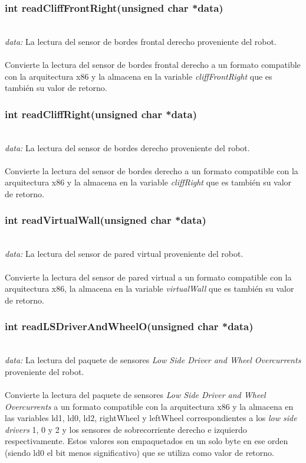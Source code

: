 \documentclass[letterpaper]{book}
\begin{document}
\subsubsection{int readCliffFrontRight(unsigned char *data)}\mbox{}\\
\emph{data: }La lectura del sensor de bordes frontal derecho proveniente del robot.\\\\
Convierte la lectura del sensor de bordes frontal derecho a un formato compatible con la arquitectura x86 y la almacena en la variable \emph{cliffFrontRight} que es también su valor de retorno.\\ 

\subsubsection{int readCliffRight(unsigned char *data)}\mbox{}\\
\emph{data: }La lectura del sensor de bordes derecho proveniente del robot.\\\\
Convierte la lectura del sensor de bordes derecho a un formato compatible con la arquitectura x86 y la almacena en la variable \emph{cliffRight} que es también su valor de retorno.\\ 

\subsubsection{int readVirtualWall(unsigned char *data)}\mbox{}\\
\emph{data: }La lectura del sensor de pared virtual proveniente del robot.\\\\
Convierte la lectura del sensor de pared virtual a un formato compatible con la arquitectura x86, la almacena en la variable \emph{virtualWall} que es también su valor de retorno.\\ 

\subsubsection{int readLSDriverAndWheelO(unsigned char *data)}\mbox{}\\
\emph{data: }La lectura del paquete de sensores \emph{Low Side Driver and Wheel Overcurrents} proveniente del robot.\\\\
Convierte la lectura del paquete de sensores \emph{Low Side Driver and Wheel Overcurrents} a un formato compatible con la arquitectura x86 y la almacena en las variables ld1, ld0, ld2, rightWheel y	leftWheel correspondientes a los \emph{low side drivers} 1, 0 y 2 y los sensores de sobrecorriente derecho e izquierdo respectivamente. Estos valores son empaquetados en un solo byte en ese orden (siendo ld0 el bit menos significativo) que se utiliza como valor de retorno.\\
\end{document}
